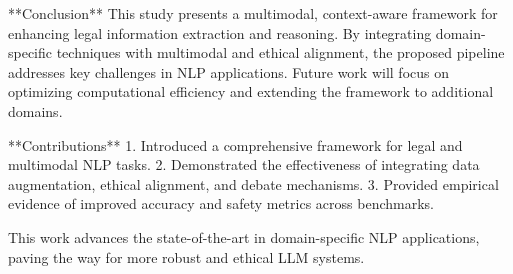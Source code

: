 **Conclusion**  
This study presents a multimodal, context-aware framework for enhancing legal information extraction and reasoning. By integrating domain-specific techniques with multimodal and ethical alignment, the proposed pipeline addresses key challenges in NLP applications. Future work will focus on optimizing computational efficiency and extending the framework to additional domains.  

**Contributions**  
1. Introduced a comprehensive framework for legal and multimodal NLP tasks.  
2. Demonstrated the effectiveness of integrating data augmentation, ethical alignment, and debate mechanisms.  
3. Provided empirical evidence of improved accuracy and safety metrics across benchmarks.  

This work advances the state-of-the-art in domain-specific NLP applications, paving the way for more robust and ethical LLM systems.  